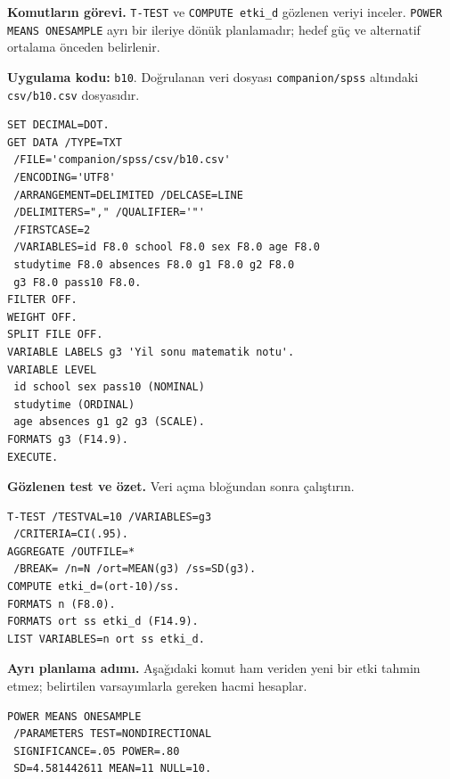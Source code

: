 {\raggedright
\noindent\textbf{Komutların görevi.} \texttt{T-TEST} ve \texttt{COMPUTE etki\_d} gözlenen veriyi inceler. \texttt{POWER MEANS ONESAMPLE} ayrı bir ileriye dönük planlamadır; hedef güç ve alternatif ortalama önceden belirlenir.\par}

\textbf{Uygulama kodu:} \texttt{b10}. Doğrulanan veri dosyası
\texttt{companion/spss} altındaki \texttt{csv/b10.csv} dosyasıdır.

\begin{lstlisting}[style=prismSPSS]
SET DECIMAL=DOT.
GET DATA /TYPE=TXT
 /FILE='companion/spss/csv/b10.csv'
 /ENCODING='UTF8'
 /ARRANGEMENT=DELIMITED /DELCASE=LINE
 /DELIMITERS="," /QUALIFIER='"'
 /FIRSTCASE=2
 /VARIABLES=id F8.0 school F8.0 sex F8.0 age F8.0
 studytime F8.0 absences F8.0 g1 F8.0 g2 F8.0
 g3 F8.0 pass10 F8.0.
FILTER OFF.
WEIGHT OFF.
SPLIT FILE OFF.
VARIABLE LABELS g3 'Yil sonu matematik notu'.
VARIABLE LEVEL
 id school sex pass10 (NOMINAL)
 studytime (ORDINAL)
 age absences g1 g2 g3 (SCALE).
FORMATS g3 (F14.9).
EXECUTE.
\end{lstlisting}

\par\noindent\begin{minipage}{\linewidth}
\textbf{Gözlenen test ve özet.} Veri açma bloğundan sonra çalıştırın.

\begin{lstlisting}[style=prismSPSS]
T-TEST /TESTVAL=10 /VARIABLES=g3
 /CRITERIA=CI(.95).
AGGREGATE /OUTFILE=*
 /BREAK= /n=N /ort=MEAN(g3) /ss=SD(g3).
COMPUTE etki_d=(ort-10)/ss.
FORMATS n (F8.0).
FORMATS ort ss etki_d (F14.9).
LIST VARIABLES=n ort ss etki_d.
\end{lstlisting}
\end{minipage}\par

\par\noindent\begin{minipage}{\linewidth}
\textbf{Ayrı planlama adımı.} Aşağıdaki komut ham veriden yeni bir
etki tahmin etmez; belirtilen varsayımlarla gereken hacmi hesaplar.

\begin{lstlisting}[style=prismSPSS]
POWER MEANS ONESAMPLE
 /PARAMETERS TEST=NONDIRECTIONAL
 SIGNIFICANCE=.05 POWER=.80
 SD=4.581442611 MEAN=11 NULL=10.
\end{lstlisting}

\end{minipage}\par

